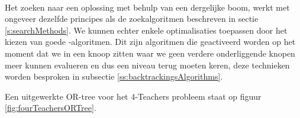 \paragraph{}
Het zoeken naar een oplossing met behulp van een dergelijke boom, werkt met ongeveer dezelfde principes als de zoekalgoritmen beschreven in sectie \ref{s:searchMethods}. We kunnen echter enkele optimalisaties toepassen door het kiezen van goede -algoritmen. Dit zijn algoritmen die geactiveerd worden op het moment dat we in een knoop zitten waar we geen verdere onderliggende knopen meer kunnen evalueren en dus een niveau terug moeten keren, deze technieken worden besproken in subsectie \ref{ss:backtrackingsAlgorithms}.
\begin{leftbar}
Een uitgewerkte OR-tree voor het 4-Teachers probleem staat op figuur \ref{fig:fourTeachersORTree}.
\end{leftbar}

